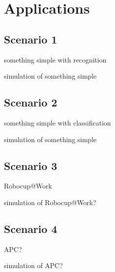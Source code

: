 
\chapter{Applications}
\label{cha:applications}


\section{Scenario 1}
\label{sec:scenario1}

something simple with recognition

simulation of something simple


\section{Scenario 2}
\label{sec:scenario2}

something simple with classification

simulation of something simple


\section{Scenario 3}
\label{sec:scenario3}

Robocup@Work

simulation of Robocup@Work?


\section{Scenario 4}
\label{sec:scenario4}

APC?

simulation of APC?


